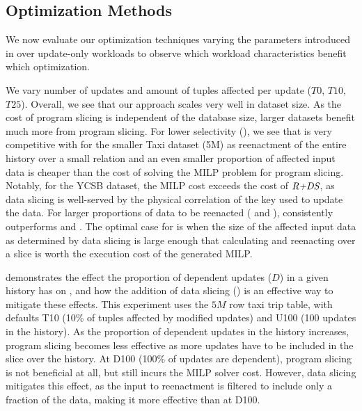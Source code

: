




\subsection{Optimization Methods}
We now evaluate our optimization techniques varying the parameters introduced in  over update-only workloads to observe which workload characteristics benefit which optimization.

We vary number of updates and amount of tuples affected per update ($T0$, $T10$, $T25$). Overall, we see that our approach scales very well in dataset size. As the cost of program slicing is independent of the database size, larger datasets benefit much more from program slicing. 
For lower selectivity (), we see that \mrd is very competitive with \mrdp for the smaller Taxi dataset (5M) as reenactment of the entire history over a small relation and an even smaller proportion of affected input data is cheaper than the cost of solving the MILP problem for program slicing. Notably, for the YCSB dataset, the MILP cost exceeds the cost of $\textit{R+DS}$, as data slicing is well-served by the physical correlation of the key used to update the data. For larger proportions of data to be reenacted ( and ),  \mrdp  consistently outperforms \mrp and \mrd. The optimal case for \mrdp is when the size of the  affected input data as determined by data slicing is large enough that calculating and reenacting over a slice is worth the execution cost of the generated MILP.


\label{sec:exp-dep}

 demonstrates the effect the proportion of dependent updates ($D$) in a given history has on \mrp, and how the addition of data slicing (\mrdp) is an effective way to mitigate these effects. This experiment uses the $5M$ row taxi trip table, with defaults T10 (10\% of tuples affected by modified updates) and U100 (100 updates in the history). As the proportion of dependent updates in the history increases, program slicing becomes less effective as more updates have to be included in the slice over the history. At D100 (100\% of updates are dependent), program slicing is not beneficial at all, but still incurs the MILP solver cost. However, data slicing  mitigates this effect, as the input to reenactment is filtered to include only a fraction of the data, making it more effective than \mrp at D100.



